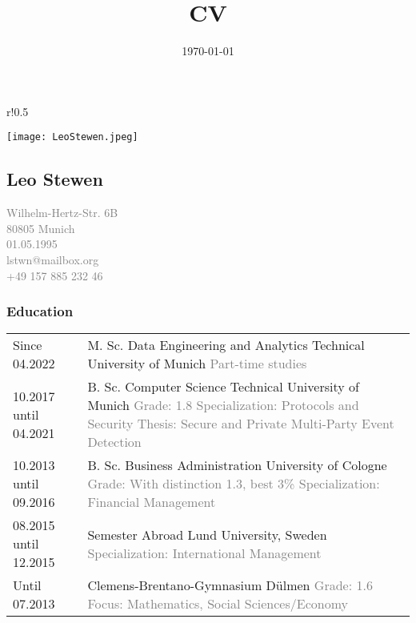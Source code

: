 \documentclass[USenglish]{article} %
\title{CV \name{} \surname{}}
\author{\name{} \surname{}}
\date{\today}
\makeatletter
\newcommand{\surname}{Stewen}
\newcommand{\name}{Leo}
\newcommand{\street}{Wilhelm-Hertz-Str. 6B}
\newcommand{\zip}{80805}
\newcommand{\city}{Munich}
\newcommand{\email}{lstwn@mailbox.org}
\newcommand{\phone}{+49 157 885 232 46}
\newcommand{\birthday}{01.05.1995}
\makeatother
\begin{document}
\begin{wrapfigure}{r!}{0.5\textwidth}
  \begin{flushright}
    \texttt{[image: LeoStewen.jpeg]}
  \end{flushright}\label{img:passphoto}
\end{wrapfigure}

\subsection*{\name{} \surname{}}
\textcolor{gray}{
  \street{}\\
  \zip{} \city{}\\
  \birthday{}\\
  \email{}\\
  \phone{}
  \bigskip
  \bigskip
  \bigskip
  \bigskip
  \bigskip
  \bigskip
}

\subsubsection*{Education}
\begin{table}[h]
\begin{tabularx}{\textwidth}{@{}p{4cm}X}

  Since 04.2022 &
  M. Sc. Data Engineering and Analytics \textbar{} Technical University of Munich
  \textcolor{gray}{
    \newline Part-time studies} \\

  10.2017 until 04.2021 &
  B. Sc. Computer Science \textbar{} Technical University of Munich
  \textcolor{gray}{
    \newline Grade: 1.8
    \newline Specialization: Protocols and Security
    \newline Thesis: Secure and Private Multi-Party Event Detection} \\

  10.2013 until 09.2016 &
  B. Sc. Business Administration \textbar{} University of Cologne
  \textcolor{gray}{
    \newline Grade: With distinction 1.3, best 3\%
    \newline Specialization: Financial Management} \\

  08.2015 until 12.2015 &
  Semester Abroad \textbar{} Lund University, Sweden
  \textcolor{gray}{
    \newline Specialization: International Management} \\

  Until 07.2013         &
  Clemens-Brentano-Gymnasium \textbar{} Dülmen
  \textcolor{gray}{
    \newline Grade: 1.6
    \newline Focus: Mathematics, Social Sciences/Economy} \\

\end{tabularx}\label{tab:education}
\end{table}
\end{document}
